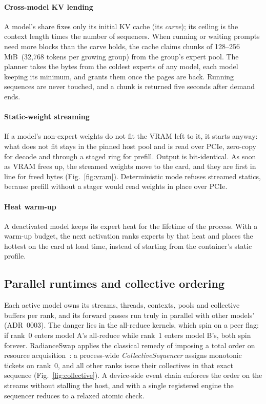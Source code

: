 \documentclass[10pt,conference,a4paper]{IEEEtran}
\newcommand{\MiB}{\,MiB}
\begin{document}
\paragraph{Cross-model KV lending} A model's share fixes only its initial KV cache (its
\emph{carve}); its ceiling is the context length times the number of sequences. When running or
waiting prompts need more blocks than the carve holds, the cache claims chunks of 128--256\MiB\
(32{,}768 tokens per growing group) from the group's expert pool. The planner takes the bytes from
the coldest experts of any model, each model keeping its minimum, and grants them once the pages are
back. Running sequences are never touched, and a chunk is returned five seconds after demand ends.

\paragraph{Static-weight streaming} If a model's non-expert weights do not fit the VRAM left to it,
it starts anyway: what does not fit stays in the pinned host pool and is read over PCIe, zero-copy
for decode and through a staged ring for prefill. Output is bit-identical. As soon as VRAM frees up,
the streamed weights move to the card, and they are first in line for freed bytes
(Fig.~\ref{fig:vram}). Deterministic mode refuses streamed statics, because prefill without a stager
would read weights in place over PCIe.

\paragraph{Heat warm-up} A deactivated model keeps its expert heat for the lifetime of the
process. With a warm-up budget, the next activation ranks experts by that heat and places the
hottest on the card at load time, instead of starting from the container's static profile.

\subsection{Parallel runtimes and collective ordering}\label{sec:collectives}

Each active model owns its streams, threads, contexts, pools and collective buffers per rank, and
its forward passes run truly in parallel with other models' (ADR~0003). The danger lies in the
all-reduce kernels, which spin on a peer flag: if rank~0 enters model A's all-reduce while rank~1
enters model B's, both spin forever. RadianceSwap applies the classical remedy of imposing a total
order on resource acquisition~\cite{havender1968}: a process-wide \emph{CollectiveSequencer}
assigns monotonic tickets on rank~0, and all other ranks issue their collectives in that exact
sequence (Fig.~\ref{fig:collective}). A device-side event chain enforces the order on the streams
without stalling the host, and with a single registered engine the sequencer reduces to a relaxed
atomic check.
\end{document}
